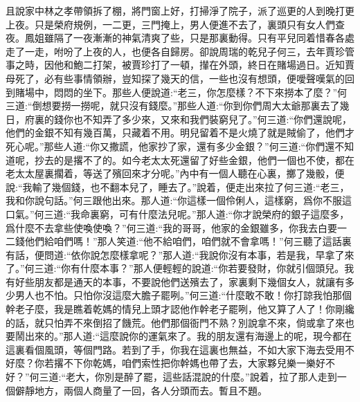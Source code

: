 \begin{parag}
    且說家中林之孝帶領拆了棚，將門窗上好，打掃淨了院子，派了巡更的人到晚打更上夜。只是榮府規例，一二更，三門掩上，男人便進不去了，裏頭只有女人們查夜。鳳姐雖隔了一夜漸漸的神氣清爽了些，只是那裏動得。只有平兒同着惜春各處走了一走，咐吩了上夜的人，也便各自歸房。卻說周瑞的乾兒子何三，去年賈珍管事之時，因他和鮑二打架，被賈珍打了一頓，攆在外頭，終日在賭場過日。近知賈母死了，必有些事情領辦，豈知探了幾天的信，一些也沒有想頭，便噯聲嘆氣的回到賭場中，悶悶的坐下。那些人便說道:“老三，你怎麼樣？不下來撈本了麼？”何三道:“倒想要撈一撈呢，就只沒有錢麼。”那些人道:“你到你們周大太爺那裏去了幾日，府裏的錢你也不知弄了多少來，又來和我們裝窮兒了。”何三道:“你們還說呢，他們的金銀不知有幾百萬，只藏着不用。明兒留着不是火燒了就是賊偷了，他們才死心呢。”那些人道:“你又撒謊，他家抄了家，還有多少金銀？”何三道:“你們還不知道呢，抄去的是撂不了的。如今老太太死還留了好些金銀，他們一個也不使，都在老太太屋裏擱着，等送了殯回來才分呢。”內中有一個人聽在心裏，擲了幾骰，便說:“我輸了幾個錢，也不翻本兒了，睡去了。”說着，便走出來拉了何三道:“老三，我和你說句話。”何三跟他出來。那人道:“你這樣一個伶俐人，這樣窮，爲你不服這口氣。”何三道:“我命裏窮，可有什麼法兒呢。”那人道:“你才說榮府的銀子這麼多，爲什麼不去拿些使喚使喚？”何三道:“我的哥哥，他家的金銀雖多，你我去白要一二錢他們給咱們嗎！”那人笑道:“他不給咱們，咱們就不會拿嗎！”何三聽了這話裏有話，便問道:“依你說怎麼樣拿呢？”那人道:“我說你沒有本事，若是我，早拿了來了。”何三道:“你有什麼本事？”那人便輕輕的說道:“你若要發財，你就引個頭兒。我有好些朋友都是通天的本事，不要說他們送殯去了，家裏剩下幾個女人，就讓有多少男人也不怕。只怕你沒這麼大膽子罷咧。”何三道:“什麼敢不敢！你打諒我怕那個幹老子麼，我是瞧着乾媽的情兒上頭才認他作幹老子罷咧，他又算了人了！你剛纔的話，就只怕弄不來倒招了饑荒。他們那個衙門不熟？別說拿不來，倘或拿了來也要鬧出來的。”那人道:“這麼說你的運氣來了。我的朋友還有海邊上的呢，現今都在這裏看個風頭，等個門路。若到了手，你我在這裏也無益，不如大家下海去受用不好麼？你若撂不下你乾媽，咱們索性把你幹媽也帶了去，大家夥兒樂一樂好不好？”何三道:“老大，你別是醉了罷，這些話混說的什麼。”說着，拉了那人走到一個僻靜地方，兩個人商量了一回，各人分頭而去。暫且不題。
\end{parag}


